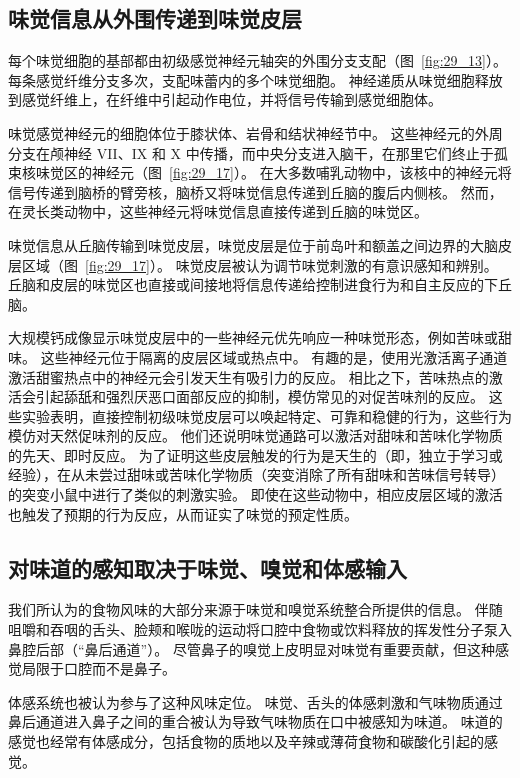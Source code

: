 \subsection{味觉信息从外围传递到味觉皮层}

每个味觉细胞的基部都由初级感觉神经元轴突的外围分支支配（图~\ref{fig:29_13}）。
每条感觉纤维分支多次，支配味蕾内的多个味觉细胞。
神经递质从味觉细胞释放到感觉纤维上，在纤维中引起动作电位，并将信号传输到感觉细胞体。


味觉感觉神经元的细胞体位于膝状体、岩骨和结状神经节中。
这些神经元的外周分支在颅神经 VII、IX 和 X 中传播，而中央分支进入脑干，在那里它们终止于孤束核味觉区的神经元（图~\ref{fig:29_17}）。
在大多数哺乳动物中，该核中的神经元将信号传递到脑桥的臂旁核，脑桥又将味觉信息传递到丘脑的腹后内侧核。 
然而，在灵长类动物中，这些神经元将味觉信息直接传递到丘脑的味觉区。


味觉信息从丘脑传输到味觉皮层，味觉皮层是位于前岛叶和额盖之间边界的大脑皮层区域（图~\ref{fig:29_17}）。
味觉皮层被认为调节味觉刺激的有意识感知和辨别。
丘脑和皮层的味觉区也直接或间接地将信息传递给控制进食行为和自主反应的下丘脑。


大规模钙成像显示味觉皮层中的一些神经元优先响应一种味觉形态，例如苦味或甜味。
这些神经元位于隔离的皮层区域或热点中。
有趣的是，使用光激活离子通道激活甜蜜热点中的神经元会引发天生有吸引力的反应。
相比之下，苦味热点的激活会引起舔舐和强烈厌恶口面部反应的抑制，模仿常见的对促苦味剂的反应。
这些实验表明，直接控制初级味觉皮层可以唤起特定、可靠和稳健的行为，这些行为模仿对天然促味剂的反应。
他们还说明味觉通路可以激活对甜味和苦味化学物质的先天、即时反应。
为了证明这些皮层触发的行为是天生的（即，独立于学习或经验），在从未尝过甜味或苦味化学物质（突变消除了所有甜味和苦味信号转导）的突变小鼠中进行了类似的刺激实验。
即使在这些动物中，相应皮层区域的激活也触发了预期的行为反应，从而证实了味觉的预定性质。



\subsection{对味道的感知取决于味觉、嗅觉和体感输入}

我们所认为的食物风味的大部分来源于味觉和嗅觉系统整合所提供的信息。
伴随咀嚼和吞咽的舌头、脸颊和喉咙的运动将口腔中食物或饮料释放的挥发性分子泵入鼻腔后部（“鼻后通道”）。 
尽管鼻子的嗅觉上皮明显对味觉有重要贡献，但这种感觉局限于口腔而不是鼻子。


体感系统也被认为参与了这种风味定位。
味觉、舌头的体感刺激和气味物质通过鼻后通道进入鼻子之间的重合被认为导致气味物质在口中被感知为味道。
味道的感觉也经常有体感成分，包括食物的质地以及辛辣或薄荷食物和碳酸化引起的感觉。



